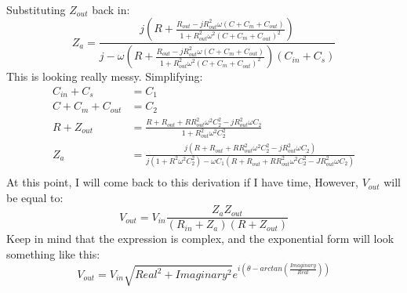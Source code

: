 \documentclass[a4paper,12pt]{article}
\newcommand{\F}[2]{\ensuremath{\frac{#1}{#2}}}
\newcommand{\LP}{\left(}
\newcommand{\RP}{\right)}
\begin{document}
\\
Substituting $Z_{out}$ back in:
\[Z_a=\F{j\LP R+\F{R_{out}-jR_{out}^2\omega(C+C_m+C_{out})}{1+R_{out}^2\omega^2(C+C_m+C_{out})^2}\RP}{j-\omega\LP R+\F{R_{out}-jR_{out}^2\omega(C+C_m+C_{out})}{1+R_{out}^2\omega^2(C+C_m+C_{out})^2}\RP(C_{in}+C_s)}\]
This is looking really messy. Simplifying:
\begin{align*}
C_{in}+C_s&=C_1\\
C+C_m+C_{out}&=C_2\\
R+Z_{out}&=\F{R+R_{out}+RR_{out}^2\omega^2C_2^2-jR_{out}^2\omega C_2}{1+R_{out}^2\omega^2C_2^2}\\
Z_a&=\F{j(R+R_{out}+RR_{out}^2\omega^2C_2^2-jR_{out}^2\omega C_2)}{j(1+R^2\omega^2C_2^2)-\omega C_1(R+R_{out}+RR_{out}^2\omega^2C_2^2-JR_{out}^2\omega C_2)}\\
\end{align*}
At this point, I will come back to this derivation if I have time, However, $V_{out}$ will be equal to:
\[V_{out}=V_{in}\F{Z_aZ_{out}}{(R_{in}+Z_a)(R+Z_{out})}\]
Keep in mind that the expression is complex, and the exponential form will look something like this:
\[V_{out}=V_{in}\sqrt{Real^2+Imaginary^2}e^{i(\theta-arctan\LP\F{Imaginary}{Real}\RP)}\]
\newpage
\end{document}
